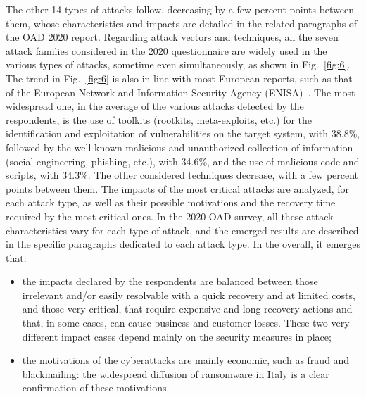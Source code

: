 \documentclass{easychair}
\begin{document}
The other 14 types of attacks follow, decreasing by a few percent points between them, whose characteristics and impacts are detailed in the related 
paragraphs of the OAD 2020 report. Regarding attack vectors and techniques, all the seven attack families considered in the 2020 questionnaire are widely used in the various 
types of attacks, sometime even simultaneously, as shown in Fig.~\ref{fig:6}. The trend in Fig.~\ref{fig:6} is also in line with most European reports, such as
that of the European Network and Information Security Agency (ENISA)~\cite{enisa20}. 
The most widespread one, in the average of the various attacks detected by the respondents, is the use of toolkits (rootkits, meta-exploits, etc.)
for the identification and exploitation of vulnerabilities
on the target system, with 38.8\%, followed by the well-known malicious and unauthorized collection of information (social engineering, phishing, etc.), with 34.6\%,
and the use of malicious code and scripts, with 34.3\%. The other considered techniques decrease, with a few percent points between them. The impacts of the most 
critical attacks are analyzed, for each attack type, as well as their possible motivations and the recovery time required by the most critical ones.
In the 2020 OAD survey, all these attack characteristics vary for each type of attack, and the emerged results are described in the specific paragraphs dedicated to each attack 
type. In the overall, it emerges that:
\begin{itemize}
\item the impacts declared by the respondents are balanced between those irrelevant and/or easily resolvable with a quick recovery and at limited costs, and those very 
critical, that require expensive and long recovery actions and that, in some cases, can cause business and customer losses. These two very different impact cases depend mainly 
on the security measures in place;
\item the motivations of the cyberattacks are mainly economic, such as fraud and blackmailing: the widespread diffusion of ransomware in Italy is a clear 
confirmation of these motivations.
\end{itemize}
\end{document}
